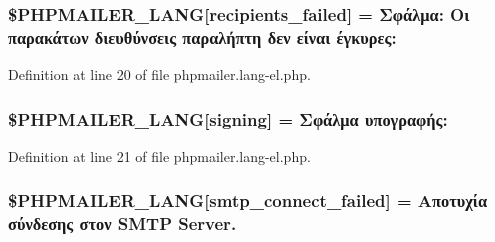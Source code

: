 \subsubsection[{\texorpdfstring{\$\+P\+H\+P\+M\+A\+I\+L\+E\+R\+\_\+\+L\+A\+NG}{$PHPMAILER_LANG}}]{\setlength{\rightskip}{0pt plus 5cm}\$P\+H\+P\+M\+A\+I\+L\+E\+R\+\_\+\+L\+A\+NG\mbox{[}\textquotesingle{}recipients\+\_\+failed\textquotesingle{}\mbox{]} =  Σφάλμα\+: Οι παρακάτων διευθύνσεις παραλήπτη δεν είναι έγκυρες\+: \textquotesingle{}}\hypertarget{phpmailer_8lang-el_8php_a7589d30bb9b368327c2df015f3e6bcba}{}\label{phpmailer_8lang-el_8php_a7589d30bb9b368327c2df015f3e6bcba}


Definition at line 20 of file phpmailer.\+lang-\/el.\+php.

\subsubsection[{\texorpdfstring{\$\+P\+H\+P\+M\+A\+I\+L\+E\+R\+\_\+\+L\+A\+NG}{$PHPMAILER_LANG}}]{\setlength{\rightskip}{0pt plus 5cm}\$P\+H\+P\+M\+A\+I\+L\+E\+R\+\_\+\+L\+A\+NG\mbox{[}\textquotesingle{}signing\textquotesingle{}\mbox{]} = \textquotesingle{}Σφάλμα υπογραφής\+: \textquotesingle{}}\hypertarget{phpmailer_8lang-el_8php_a68e437bdb9b968a5a67320f03d231565}{}\label{phpmailer_8lang-el_8php_a68e437bdb9b968a5a67320f03d231565}


Definition at line 21 of file phpmailer.\+lang-\/el.\+php.

\subsubsection[{\texorpdfstring{\$\+P\+H\+P\+M\+A\+I\+L\+E\+R\+\_\+\+L\+A\+NG}{$PHPMAILER_LANG}}]{\setlength{\rightskip}{0pt plus 5cm}\$P\+H\+P\+M\+A\+I\+L\+E\+R\+\_\+\+L\+A\+NG\mbox{[}\textquotesingle{}smtp\+\_\+connect\+\_\+failed\textquotesingle{}\mbox{]} = \textquotesingle{}Αποτυχία σύνδεσης στον {\bf S\+M\+TP} Server.\textquotesingle{}}\hypertarget{phpmailer_8lang-el_8php_a7b321d4ca1e9df702403ed4c61aa0980}{}\label{phpmailer_8lang-el_8php_a7b321d4ca1e9df702403ed4c61aa0980}


